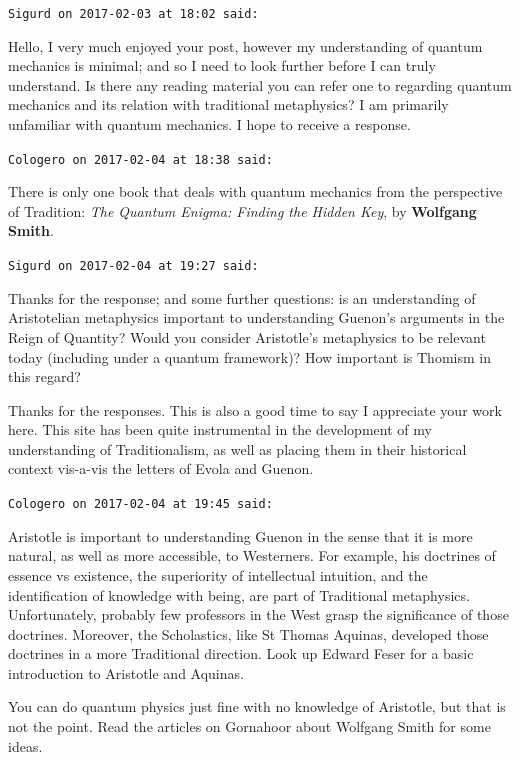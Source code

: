 \begin{footnotesize}
\begin{sffamily}
\texttt{Sigurd on 2017-02-03 at 18:02 said:}

Hello, I very much enjoyed your post, however my understanding of quantum mechanics is minimal; and so I need to look further before I can truly understand. Is there any reading material you can refer one to regarding quantum mechanics and its relation with traditional metaphysics? I am primarily unfamiliar with quantum mechanics. I hope to receive a response.

\hfill

\texttt{Cologero on 2017-02-04 at 18:38 said:}

There is only one book that deals with quantum mechanics from the perspective of Tradition: \emph{The Quantum Enigma: Finding the Hidden Key}, by \textbf{Wolfgang Smith}.

\hfill

\texttt{Sigurd on 2017-02-04 at 19:27 said:}

Thanks for the response; and some further questions: is an understanding of Aristotelian metaphysics important to understanding Guenon's arguments in the Reign of Quantity? Would you consider Aristotle's metaphysics to be relevant today (including under a quantum framework)? How important is Thomism in this regard?

Thanks for the responses. This is also a good time to say I appreciate your work here. This site has been quite instrumental in the development of my understanding of Traditionalism, as well as placing them in their historical context vis-a-vis the letters of Evola and Guenon.

\hfill

\texttt{Cologero on 2017-02-04 at 19:45 said:}

Aristotle is important to understanding Guenon in the sense that it is more natural, as well as more accessible, to Westerners. For example, his doctrines of essence vs existence, the superiority of intellectual intuition, and the identification of knowledge with being, are part of Traditional metaphysics. Unfortunately, probably few professors in the West grasp the significance of those doctrines. Moreover, the Scholastics, like St Thomas Aquinas, developed those doctrines in a more Traditional direction. Look up Edward Feser for a basic introduction to Aristotle and Aquinas.

You can do quantum physics just fine with no knowledge of Aristotle, but that is not the point. Read the articles on Gornahoor about Wolfgang Smith for some ideas.


\end{sffamily}
\end{footnotesize}
